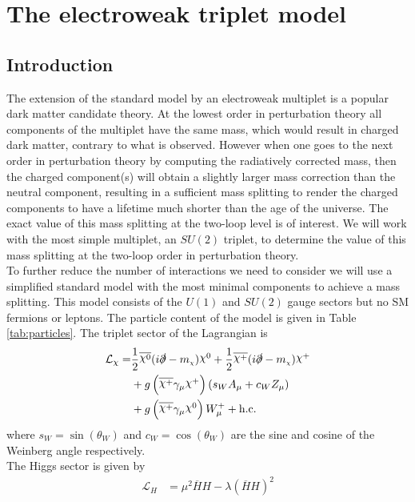 \documentclass[11pt]{article}
\newcommand{\mychi}{\raisebox{0pt}[1ex][1ex]{\tiny$\chi$}}
\newcommand{\chiinline}{\raisebox{1.7pt}[1ex][1ex]{$\chi$}}
\def\mc{m_{\mychi}}
\begin{document}
\section{The electroweak triplet model}
\subsection{Introduction}
The extension of the standard model by an electroweak multiplet is a popular dark matter candidate theory.  At the lowest order in perturbation theory all components of the multiplet have the same mass, which would result in charged dark matter, contrary to what is observed.  However when one goes to the next order in perturbation theory by computing the radiatively corrected mass, then the charged component(s) will obtain a slightly larger mass correction than the neutral component, resulting in a sufficient mass splitting to render the charged components to have a lifetime much shorter than the age of the universe.  The exact value of this mass splitting at the two-loop level is of interest.  We will work with the most simple multiplet, an $SU(2)$ triplet, to determine the value of this mass splitting at the two-loop order in perturbation theory.\\

To further reduce the number of interactions we need to consider we will use a simplified standard model with the most minimal components to achieve a mass splitting.  This model consists of the $U(1)$ and $SU(2)$ gauge sectors but no SM fermions or leptons.  The particle content of the model is given in Table \ref{tab:particles}.  The triplet sector of the Lagrangian is
\begin{align}
\begin{split}
\mathcal{L}_{\chi}=&\frac{1}{2}\overline{\chiinline^0}(i\slashed{\partial}-\mc)\chiinline^0+\frac{1}{2}\overline{\chiinline^+}(i\slashed{\partial}-\mc)\chiinline^{+}\\
&+g\left(\overline{\chiinline^+}\gamma_{\mu}\chiinline^+\right)\left(s_WA_{\mu}+c_WZ_{\mu}\right)\\
&+g\left(\overline{\chiinline^+}\gamma_{\mu}\chiinline^0 \right)W_{\mu}^++\text{h.c.}
\end{split}
\end{align}
where $s_W=\sin(\theta_W)$ and $c_W=\cos(\theta_W)$ are the sine and cosine of the Weinberg angle respectively.\\

The Higgs sector is given by
\begin{align}
\mathcal{L}_{H}&=\mu^2 \overline{H}H-\lambda(\overline{H}H)^2
\end{align}
\end{document}
